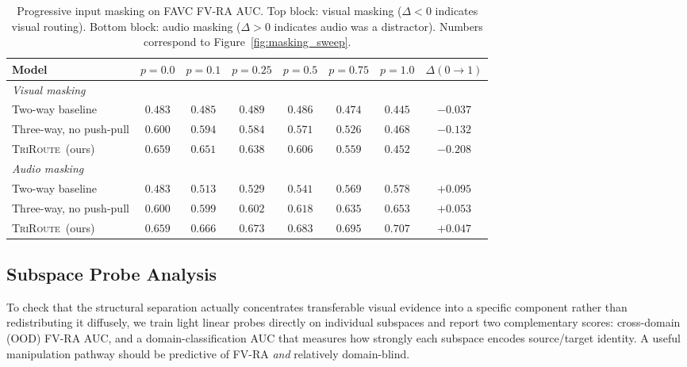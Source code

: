 \documentclass{article}
\newcommand{\method}{\textsc{TriRoute}}
\begin{document}
\begin{table}[t]
    \centering
    \caption{Progressive input masking on FAVC FV-RA AUC. Top block: visual masking ($\Delta < 0$ indicates visual routing). Bottom block: audio masking ($\Delta > 0$ indicates audio was a distractor). Numbers correspond to Figure~\ref{fig:masking_sweep}.}
    \label{tab:masking_sweep}
    \small
    \begin{tabular}{lccccccc}
        \toprule
        Model & $p{=}0.0$ & $p{=}0.1$ & $p{=}0.25$ & $p{=}0.5$ & $p{=}0.75$ & $p{=}1.0$ & $\Delta(0{\rightarrow}1)$ \\
        \midrule
        \multicolumn{8}{l}{\emph{Visual masking}} \\
        Two-way baseline        & $0.483$ & $0.485$ & $0.489$ & $0.486$ & $0.474$ & $0.445$ & $-0.037$ \\
        Three-way, no push-pull & $0.600$ & $0.594$ & $0.584$ & $0.571$ & $0.526$ & $0.468$ & $-0.132$ \\
        \method\ (ours)         & $0.659$ & $0.651$ & $0.638$ & $0.606$ & $0.559$ & $0.452$ & $\mathbf{-0.208}$ \\
        \midrule
        \multicolumn{8}{l}{\emph{Audio masking}} \\
        Two-way baseline        & $0.483$ & $0.513$ & $0.529$ & $0.541$ & $0.569$ & $0.578$ & $+0.095$ \\
        Three-way, no push-pull & $0.600$ & $0.599$ & $0.602$ & $0.618$ & $0.635$ & $0.653$ & $+0.053$ \\
        \method\ (ours)         & $0.659$ & $0.666$ & $0.673$ & $0.683$ & $0.695$ & $0.707$ & $\mathbf{+0.047}$ \\
        \bottomrule
    \end{tabular}
\end{table}

\subsection{Subspace Probe Analysis}

To check that the structural separation actually concentrates transferable visual evidence into a specific component rather than redistributing it diffusely, we train light linear probes directly on individual subspaces and report two complementary scores: cross-domain (OOD) FV-RA AUC, and a domain-classification AUC that measures how strongly each subspace encodes source/target identity. A useful manipulation pathway should be predictive of FV-RA \emph{and} relatively domain-blind.
\end{document}
